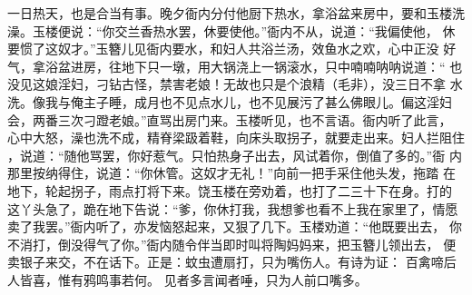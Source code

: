一日热天，也是合当有事。晚夕衙内分付他厨下热水，拿浴盆来房中，要和玉楼洗
澡。玉楼便说：“你交兰香热水罢，休要使他。”衙内不从，说道：“我偏使他，
休要惯了这奴才。”玉簪儿见衙内要水，和妇人共浴兰汤，效鱼水之欢，心中正没
好气，拿浴盆进房，往地下只一墩，用大锅浇上一锅滚水，只中喃喃呐呐说道：“
也没见这娘淫妇，刁钻古怪，禁害老娘！无故也只是个浪精（毛非），没三日不拿
水洗。像我与俺主子睡，成月也不见点水儿，也不见展污了甚么佛眼儿。偏这淫妇
会，两番三次刁蹬老娘。”直骂出房门来。玉楼听见，也不言语。衙内听了此言，
心中大怒，澡也洗不成，精脊梁趿着鞋，向床头取拐子，就要走出来。妇人拦阻住
，说道：“随他骂罢，你好惹气。只怕热身子出去，风试着你，倒值了多的。”衙
内那里按纳得住，说道：“你休管。这奴才无礼！”向前一把手采住他头发，拖踏
在地下，轮起拐子，雨点打将下来。饶玉楼在旁劝着，也打了二三十下在身。打的
这丫头急了，跪在地下告说：“爹，你休打我，我想爹也看不上我在家里了，情愿
卖了我罢。”衙内听了，亦发恼怒起来，又狠了几下。玉楼劝道：“他既要出去，
你不消打，倒没得气了你。”衙内随令伴当即时叫将陶妈妈来，把玉簪儿领出去，
便卖银子来交，不在话下。正是：蚊虫遭扇打，只为嘴伤人。有诗为证：
百禽啼后人皆喜，惟有鸦鸣事若何。
见者多言闻者唾，只为人前口嘴多。